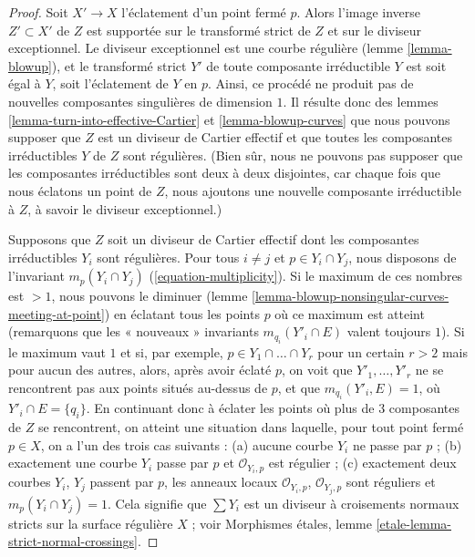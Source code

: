\begin{proof} Soit $X' \to X$ l'éclatement d'un point fermé $p$. Alors l'image inverse $Z' \subset X'$ de $Z$ est supportée sur le transformé strict de $Z$ et sur le diviseur exceptionnel. Le diviseur exceptionnel est une courbe régulière (lemme \ref{lemma-blowup}), et le transformé strict $Y'$ de toute composante irréductible $Y$ est soit égal à $Y$, soit l'éclatement de $Y$ en $p$. Ainsi, ce procédé ne produit pas de nouvelles composantes singulières de dimension $1$. Il résulte donc des lemmes \ref{lemma-turn-into-effective-Cartier} et \ref{lemma-blowup-curves} que nous pouvons supposer que $Z$ est un diviseur de Cartier effectif et que toutes les composantes irréductibles $Y$ de $Z$ sont régulières. (Bien sûr, nous ne pouvons pas supposer que les composantes irréductibles sont deux à deux disjointes, car chaque fois que nous éclatons un point de $Z$, nous ajoutons une nouvelle composante irréductible à $Z$, à savoir le diviseur exceptionnel.)

\medskip\noindent Supposons que $Z$ soit un diviseur de Cartier effectif dont les composantes irréductibles $Y_i$ sont régulières. Pour tous $i \not = j$ et $p \in Y_i \cap Y_j$, nous disposons de l'invariant $m_p(Y_i \cap Y_j)$ (\ref{equation-multiplicity}). Si le maximum de ces nombres est $> 1$, nous pouvons le diminuer (lemme \ref{lemma-blowup-nonsingular-curves-meeting-at-point}) en éclatant tous les points $p$ où ce maximum est atteint (remarquons que les « nouveaux » invariants $m_{q_i}(Y'_i \cap E)$ valent toujours $1$). Si le maximum vaut $1$ et si, par exemple, $p \in Y_1 \cap \ldots \cap Y_r$ pour un certain $r > 2$ mais pour aucun des autres, alors, après avoir éclaté $p$, on voit que $Y'_1, \ldots, Y'_r$ ne se rencontrent pas aux points situés au-dessus de $p$, et que $m_{q_i}(Y'_i, E) = 1$, où $Y'_i \cap E = \{q_i\}$. En continuant donc à éclater les points où plus de $3$ composantes de $Z$ se rencontrent, on atteint une situation dans laquelle, pour tout point fermé $p \in X$, on a l'un des trois cas suivants : (a) aucune courbe $Y_i$ ne passe par $p$ ; (b) exactement une courbe $Y_i$ passe par $p$ et $\mathcal{O}_{Y_i, p}$ est régulier ; (c) exactement deux courbes $Y_i$, $Y_j$ passent par $p$, les anneaux locaux $\mathcal{O}_{Y_i, p}$, $\mathcal{O}_{Y_j, p}$ sont réguliers et $m_p(Y_i \cap Y_j) = 1$. Cela signifie que $\sum Y_i$ est un diviseur à croisements normaux stricts sur la surface régulière $X$ ; voir Morphismes \'etales, lemme \ref{etale-lemma-strict-normal-crossings}. \end{proof}






